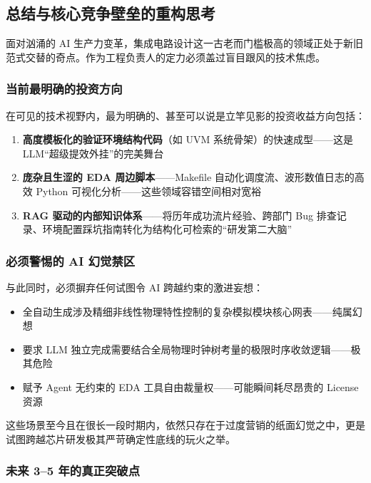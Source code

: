 \documentclass[UTF8,a4paper,10pt,oneside]{ctexart}
\begin{document}
\subsection{总结与核心竞争壁垒的重构思考}

面对汹涌的 AI 生产力变革，集成电路设计这一古老而门槛极高的领域正处于新旧范式交替的奇点。作为工程负责人的定力必须盖过盲目跟风的技术焦虑。

\subsubsection{当前最明确的投资方向}

在可见的技术视野内，最为明确的、甚至可以说是立竿见影的投资收益方向包括：

\begin{enumerate}
    \item \textbf{高度模板化的验证环境结构代码}（如 UVM 系统骨架）的快速成型——这是 LLM“超级提效外挂”的完美舞台
    \item \textbf{庞杂且生涩的 EDA 周边脚本}——Makefile 自动化调度流、波形数值日志的高效 Python 可视化分析——这些领域容错空间相对宽裕
    \item \textbf{RAG 驱动的内部知识体系}——将历年成功流片经验、跨部门 Bug 排查记录、环境配置踩坑指南转化为结构化可检索的“研发第二大脑”
\end{enumerate}

\subsubsection{必须警惕的 AI 幻觉禁区}

与此同时，必须摒弃任何试图令 AI 跨越约束的激进妄想：

\begin{itemize}
    \item 全自动生成涉及精细非线性物理特性控制的复杂模拟模块核心网表——纯属幻想
    \item 要求 LLM 独立完成需要结合全局物理时钟树考量的极限时序收敛逻辑——极其危险
    \item 赋予 Agent 无约束的 EDA 工具自由裁量权——可能瞬间耗尽昂贵的 License 资源
\end{itemize}

这些场景至今且在很长一段时期内，依然只存在于过度营销的纸面幻觉之中，更是试图跨越芯片研发极其严苛确定性底线的玩火之举。

\subsubsection{未来 3--5 年的真正突破点}
\end{document}
